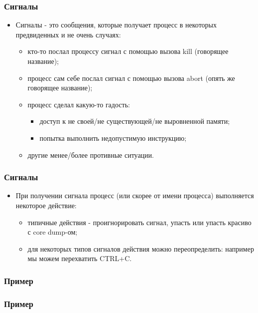 \begin{frame}
\frametitle{Сигналы}
\begin{itemize}
  \item Сигналы - это сообщения, которые получает процесс в некоторых
  предвиденных и не очень случаях:
  \begin{itemize}
    \item кто-то послал процессу сигнал с помощью вызова kill (говорящее
    название);
    \item процесс сам себе послал сигнал с помощью вызова abort (опять же
    говорящее название);
    \item процесс сделал какую-то гадость:
    \begin{itemize}
      \item доступ к не своей/не существующей/не выровненной памяти;
      \item попытка выполнить недопустимую инструкцию;
    \end{itemize}
    \item другие менее/более противные ситуации.
  \end{itemize}
\end{itemize}
\end{frame}

\begin{frame}
\frametitle{Сигналы}
\begin{itemize}
  \item При получении сигнала процесс (или скорее от имени процесса) выполняется
  некоторое действие:
  \begin{itemize}
    \item типичные действия - проигнорировать сигнал, упасть или упасть красиво
    с core dump-ом;
    \item для некоторых типов сигналов действия можно переопределить: например
    мы можем перехватить CTRL+C.
  \end{itemize}
\end{itemize}
\end{frame}

\begin{frame}[fragile]
\frametitle{Пример}

\end{frame}

\begin{frame}[fragile]
\frametitle{Пример}

\end{frame}


